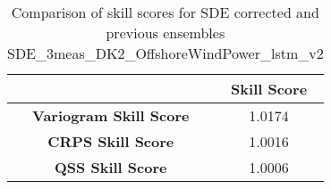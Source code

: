 
        \begin{table}[h!]
            \centering
            \begin{tabular}{|c|c|}
                \hline
                & \textbf{Skill Score}  \\
                \hline
                \textbf{Variogram Skill Score} & 1.0174  \\
                \hline
                \textbf{CRPS Skill Score} & 1.0016  \\
                \hline
                \textbf{QSS Skill Score} & 1.0006 \\
                \hline
            \end{tabular}
            \caption{Comparison of skill scores for SDE corrected and previous ensembles SDE_3meas_DK2_OffshoreWindPower_lstm_v2}
            \label{table:skill_scores_comparison}
        \end{table}
        